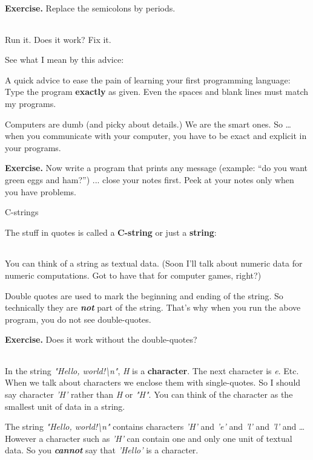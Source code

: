 \documentclass[
]{article}
\begin{document}
\textbf{Exercise.} Replace the semicolons by periods.

\begin{longtable}[]{@{}@{}}
\toprule
\endhead
\bottomrule
\end{longtable}

Run it. Does it work? Fix it.

See what I mean by this advice:

A quick advice to ease the pain of learning your first programming
language: Type the program \textbf{exactly} as given. Even the spaces
and blank lines must match my programs.

Computers are dumb (and picky about details.) We are the smart ones. So
\ldots{} when you communicate with your computer, you have to be exact
and explicit in your programs.

\textbf{Exercise.} Now write a program that prints any message (example:
``do you want green eggs and ham?'') ... close your notes first. Peek at
your notes only when you have problems.

C-strings

The stuff in quotes is called a \textbf{C-string} or just a
\textbf{string}:

\begin{longtable}[]{@{}@{}}
\toprule
\endhead
\bottomrule
\end{longtable}

You can think of a string as textual data. (Soon I'll talk about numeric
data for numeric computations. Got to have that for computer games,
right?)

Double quotes are used to mark the beginning and ending of the string.
So technically they are \emph{\textbf{not}} part of the string. That's
why when you run the above program, you do not see double-quotes.

\textbf{Exercise.} Does it work without the double-quotes?

\begin{longtable}[]{@{}@{}}
\toprule
\endhead
\bottomrule
\end{longtable}

In the string \emph{"Hello, world!\textbackslash n"}, \emph{H} is a
\textbf{character}. The next character is \emph{e}. Etc. When we talk
about characters we enclose them with single-quotes. So I should say
character \emph{'H'} rather than \emph{H} or \emph{"H"}. You can think
of the character as the smallest unit of data in a string.

The string \emph{"Hello, world!\textbackslash n"} contains characters
\emph{'H'} and \emph{'e'} and \emph{'l'} and \emph{'l'} and \ldots{}
However a character such as \emph{'H'} can contain one and only one unit
of textual data. So you \emph{\textbf{cannot}} say that \emph{'Hello'}
is a character.\emph{ }
\end{document}
